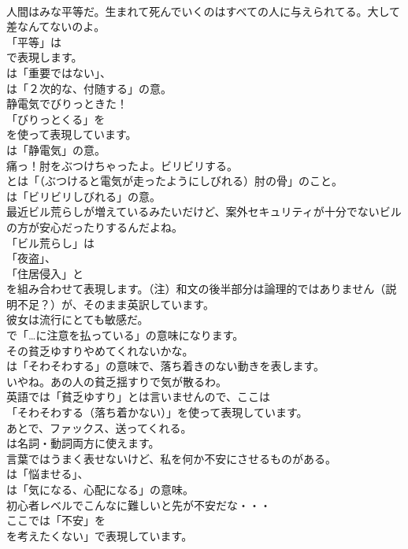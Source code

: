 \documentclass[8pt]{extreport}
\begin{document}
\begin{CJK}{UTF8}{min}
\\	人間はみな平等だ。生まれて死んでいくのはすべての人に与えられてる。大して差なんてないのよ。 
\\	「平等」は
\\	で表現します。
\\	は「重要ではない」、
\\	は「２次的な、付随する」の意。	
\\	静電気でびりっときた！ 
\\	「びりっとくる」を 
\\	を使って表現しています。
\\	は「静電気」の意。	
\\	痛っ！肘をぶつけちゃったよ。ビリビリする。 
\\	とは「（ぶつけると電気が走ったようにしびれる）肘の骨」のこと。
\\	は「ビリビリしびれる」の意。	
\\	最近ビル荒らしが増えているみたいだけど、案外セキュリティが十分でないビルの方が安心だったりするんだよね。 
\\	「ビル荒らし」は
\\	「夜盗」、
\\	「住居侵入」と
\\	を組み合わせて表現します。（注）和文の後半部分は論理的ではありません（説明不足？）が、そのまま英訳しています。	
\\	彼女は流行にとても敏感だ。 
\\	で「…に注意を払っている」の意味になります。	
\\	その貧乏ゆすりやめてくれないかな。 
\\	は「そわそわする」の意味で、落ち着きのない動きを表します。	
\\	いやね。あの人の貧乏揺すりで気が散るわ。 
\\	英語では「貧乏ゆすり」とは言いませんので、ここは
\\	「そわそわする（落ち着かない）」を使って表現しています。	
\\	あとで、ファックス、送ってくれる。 
\\	は名詞・動詞両方に使えます。	
\\	言葉ではうまく表せないけど、私を何か不安にさせるものがある。 
\\	は「悩ませる」、
\\	は「気になる、心配になる」の意味。	
\\	初心者レベルでこんなに難しいと先が不安だな・・・ 
\\	ここでは「不安」を
\\	を考えたくない」で表現しています。	

\end{CJK}
\end{document}
